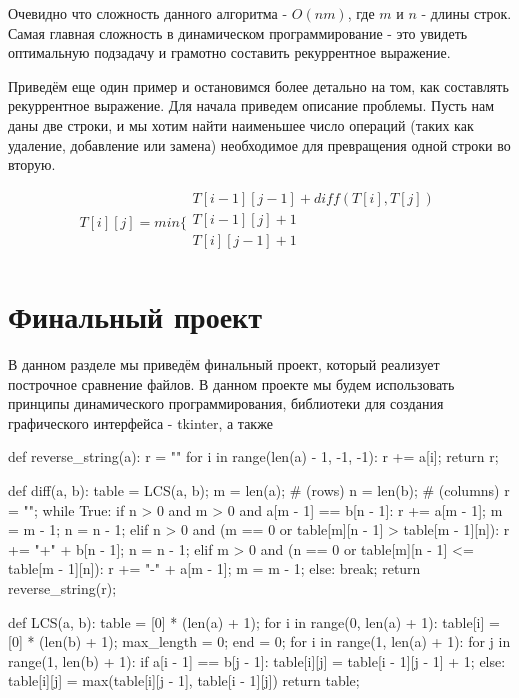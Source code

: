 Очевидно что сложность данного алгоритма - $O(nm)$, где $m$ и $n$ - длины строк. 
Самая главная сложность в динамическом программирование - это увидеть оптимальную подзадачу
и грамотно составить рекуррентное выражение. 

Приведём еще один пример и остановимся более детально на том,
как составлять рекуррентное выражение. Для начала приведем описание 
проблемы. Пусть нам даны две строки, и мы хотим найти наименьшее 
число операций (таких как удаление, добавление или замена) необходимое для
превращения одной строки во вторую. 



$$
T[i][j] = min \Bigg\{
	\begin{array}{c}
      T[i - 1][j - 1] + diff(T[i], T[j])\\
      T[i - 1][j] + 1 \\
      T[i][j - 1] + 1 \\
    \end{array}
$$

\chapter{Финальный проект}

В данном разделе мы приведём финальный проект, который реализует построчное сравнение 
файлов. В данном проекте мы будем использовать принципы динамического программирования,
библиотеки для создания графического интерфейса - tkinter, а также 


\begin{python}
def reverse_string(a):
	r = ""
	for i in range(len(a) - 1, -1, -1):
		r += a[i];
	return r;

def diff(a, b):
	table = LCS(a, b);
	m = len(a); # (rows) 
	n = len(b); # (columns)
	r = "";
	while True:
		if n > 0 and m > 0 and a[m - 1] == b[n - 1]:
			r += a[m - 1];
			m = m - 1;
			n = n - 1;
		elif n > 0 and (m == 0 or table[m][n - 1] > table[m - 1][n]):
			r += "+" + b[n - 1];
			n = n - 1;
		elif m > 0 and (n == 0 or table[m][n - 1] <= table[m - 1][n]):
			r += "-" + a[m - 1];
			m = m - 1;
		else:
			break;
	return reverse_string(r);

def LCS(a, b):
	table = [0] * (len(a) + 1);
	for i in range(0, len(a) + 1):
		table[i] = [0] * (len(b) + 1);
	max_length = 0;
	end = 0;
	for i in range(1, len(a) + 1):
		for j in range(1, len(b) + 1):
			if a[i - 1] == b[j - 1]:
				table[i][j] = table[i - 1][j - 1] + 1;
			else:
				table[i][j] = max(table[i][j - 1], table[i - 1][j])
	return table;

\end{python}

